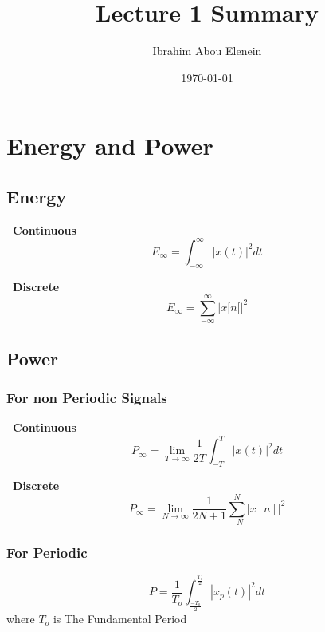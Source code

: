 \documentclass[11pt,a4paper]{article}
\theoremstyle{definition}
\begin{document}
\author{Ibrahim Abou Elenein}
\title{Lecture 1 Summary}
\date {\today}
\maketitle
\section{Energy and Power}

\subsection{Energy}

\begin{multicols}{2}
    \textbf{ \ Continuous} 
    \begin{equation}
        E_\infty= \int ^{\infty} _{- \infty} |x(t)|^2 dt 
    \end{equation}
    
    \columnbreak
    
    \textbf{ \  Discrete}
    \begin{equation}
        E_\infty= \sum ^{\infty} _{- \infty} |x[n[|^2
    \end{equation}
\end{multicols}
\subsection{Power}
\subsubsection{For non Periodic Signals }
\begin{multicols}{2}
    
    \textbf{ \ Continuous} 
    \begin{equation}
        P_{\infty} = \displaystyle \lim _{T \to \infty} \frac{1}{2T} \int 
        _{-T} ^{T} |x(t)|^2 dt
    \end{equation}
    
    \columnbreak
    
    \textbf{ \  Discrete}
    \[
        P_{\infty} = \displaystyle \lim _{N \to \infty} \frac{1}{2N+1} \sum 
        _{-N} ^{N} |x[n]|^2 
        \]
\end{multicols}
\subsubsection{For Periodic} 
\[
    P = \frac{1}{T_o} \int_{\frac{-T_o}{2}} ^{\frac{T_o}{2}} |x_p(t)|^2 dt
\]
    where $T_o$ is The Fundamental Period
    
\end{document}
